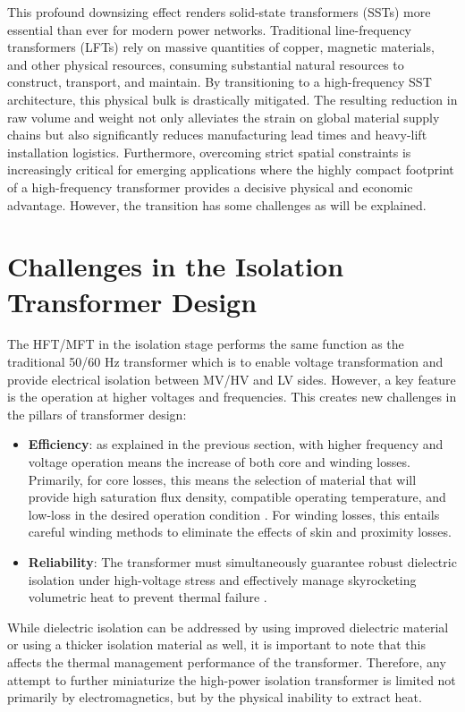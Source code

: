 This profound downsizing effect renders solid-state transformers (SSTs) more essential than ever for modern power networks. Traditional line-frequency transformers (LFTs) rely on massive quantities of copper, magnetic materials, and other physical resources, consuming substantial natural resources to construct, transport, and maintain. By transitioning to a high-frequency SST architecture, this physical bulk is drastically mitigated. The resulting reduction in raw volume and weight not only alleviates the strain on global material supply chains but also significantly reduces manufacturing lead times and heavy-lift installation logistics. Furthermore, overcoming strict spatial constraints is increasingly critical for emerging applications where the highly compact footprint of a high-frequency transformer provides a decisive physical and economic advantage. However, the transition has some challenges as will be explained.
\section{Challenges in the Isolation Transformer Design} \label{sec:challenge}
The HFT/MFT in the isolation stage performs the same function as the traditional
50/60 Hz transformer which is to enable voltage transformation and provide electrical isolation between MV/HV and LV sides. However, a key feature is the operation at higher voltages and frequencies. This creates new challenges in the pillars of transformer design:
\begin{itemize}
    \item \textbf{Efficiency}: as explained in the previous section, with higher frequency and voltage operation means the increase of both core and winding losses. Primarily, for core losses, this means the selection of material that will provide high saturation flux density, compatible operating temperature, and low-loss in the desired operation condition \cite{ref1}. For winding losses, this entails careful winding methods to eliminate the effects of skin and proximity losses.
    \item \textbf{Reliability}: The transformer must simultaneously guarantee robust dielectric isolation under high-voltage stress and effectively manage skyrocketing volumetric heat to prevent thermal failure \cite{6d7bedeb4d374ffaa54effc19030ffd3, https://doi.org/10.1049/hve2.12424}.  
\end{itemize}

While dielectric isolation can be addressed by using improved dielectric material or using a thicker isolation material as well, it is important to note that this affects the thermal management performance of the transformer. Therefore, any attempt to further miniaturize the high-power isolation transformer is limited not primarily by electromagnetics, but by the physical inability to extract heat. 

